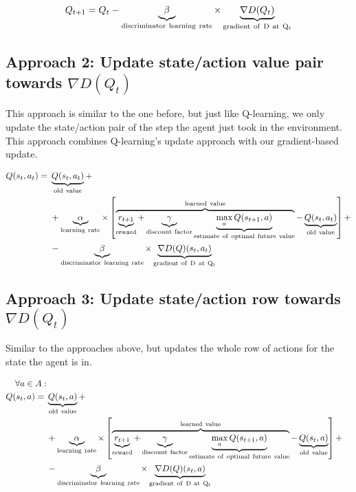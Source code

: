 \begin{equation}
Q_{t+1} = Q_{t}-\underbrace{\beta}_{\rm discriminator~learning~rate} \times \underbrace{\nabla D(Q_{t})}_{\rm gradient~of~D~at~Q_{t}}
\end{equation}

\subsection{Approach 2: Update state/action value pair towards $\nabla D(Q_{t})$}
This approach is similar to the one before, but just like Q-learning, we only update the state/action pair of the step the agent just took in the environment. This approach combines Q-learning's update approach with our gradient-based update.

\begin{equation}
\begin{aligned}
  Q(s_{t},a_{t}) ={} &\underbrace{Q(s_t,a_t)}_{\rm old~value} + \\
  & + \underbrace{\alpha}_{\rm learning~rate} \times \left[
    \overbrace{\underbrace{r_{t+1}}_{\rm reward} + \underbrace{\gamma}_{\rm
        discount~factor} \underbrace{\max_{a}Q(s_{t+1}, a)}_{\rm
        estimate~of~optimal~future~value}}^{\rm learned~value} - \underbrace{Q(s_t,a_t)}_{\rm old~value} \right] + \\
   & - \underbrace{\beta}_{\rm discriminator~learning~rate} \times \underbrace{\nabla D(Q)(s_{t}, a_{t})}_{\rm gradient~of~D~at~Q_{t}}
\end{aligned}
\end{equation}

\subsection{Approach 3: Update state/action row towards $\nabla D(Q_{t})$}
Similar to the approaches above, but updates the whole row of actions for the state the agent is in.

\begin{equation}
\begin{aligned}
  \forall a \in A: \\
  Q(s_{t},a) ={} &\underbrace{Q(s_t,a)}_{\rm old~value} + \\
  & + \underbrace{\alpha}_{\rm learning~rate} \times \left[
    \overbrace{\underbrace{r_{t+1}}_{\rm reward} + \underbrace{\gamma}_{\rm
        discount~factor} \underbrace{\max_{a}Q(s_{t+1}, a)}_{\rm
        estimate~of~optimal~future~value}}^{\rm learned~value} - \underbrace{Q(s_t,a)}_{\rm old~value} \right] + \\
   & - \underbrace{\beta}_{\rm discriminator~learning~rate} \times \underbrace{\nabla D(Q)(s_{t}, a)}_{\rm gradient~of~D~at~Q_{t}}
\end{aligned}
\end{equation}

